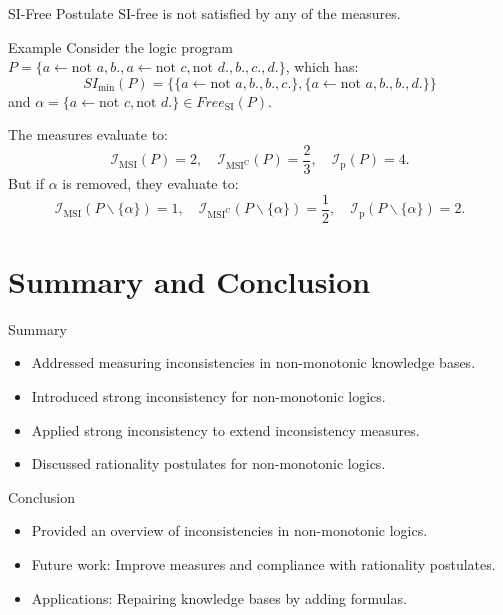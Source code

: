 \begin{frame}{SI-Free Postulate}
    SI-free is not satisfied by any of the measures.
    \begin{exampleblock}{Example}
        Consider the logic program \(P = \{a \leftarrow \text{not } a, b., a \leftarrow \text{not }c, \text{not }d., b., c., d.\}\), which has:
        \[
            SI_{\min}(P) = \{\{a \leftarrow \text{not }a, b., b., c.\}, \{a \leftarrow \text{not }a, b., b., d.\}\}
        \]
        and \(\alpha = \{a \leftarrow \text{not }c, \text{not }d.\} \in Free_{\text{SI}}(P)\).

        The measures evaluate to:
        \[
            \mathcal{I}_{\text{MSI}}(P) = 2,\quad \mathcal{I}_{\text{MSI}^\text{C}}(P) = \frac{2}{3},\quad \mathcal{I}_{\text{p}}(P) = 4.
        \]
        But if \(\alpha\) is removed, they evaluate to:
        \[
            \mathcal{I}_{\text{MSI}}(P \backslash \{\alpha\}) = 1,\quad \mathcal{I}_{\text{MSI}^\text{C}}(P \backslash \{\alpha\}) = \frac{1}{2},\quad \mathcal{I}_{\text{p}}(P \backslash \{\alpha\}) = 2.
        \]
    \end{exampleblock}
\end{frame}

\section{Summary and Conclusion}

\begin{frame}{Summary}
    \begin{itemize}
        \item Addressed measuring inconsistencies in non-monotonic knowledge bases.
        \item Introduced strong inconsistency for non-monotonic logics.
        \item Applied strong inconsistency to extend inconsistency measures.
        \item Discussed rationality postulates for non-monotonic logics.
    \end{itemize}
\end{frame}

\begin{frame}{Conclusion}
    \begin{itemize}
        \item Provided an overview of inconsistencies in non-monotonic logics.
        \item Future work: Improve measures and compliance with rationality postulates.
        \item Applications: Repairing knowledge bases by adding formulas.
    \end{itemize}
\end{frame}

